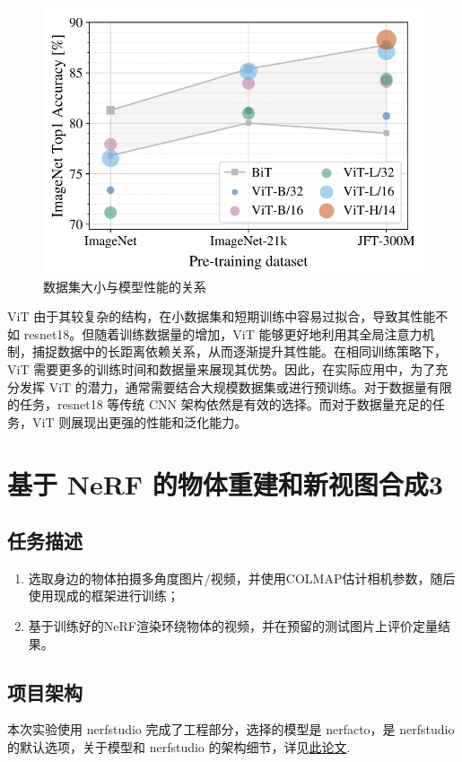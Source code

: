 \documentclass[notitlepage,cs4size,punct,oneside]{ctexrep}
\numberwithin{equation}{chapter}
\theoremstyle{mystyle}
\begin{document}
\begin{figure}[H]
    \centering
    \includegraphics[scale=0.75]{ViT_vs_CNN.png}
    \caption{数据集大小与模型性能的关系}
\end{figure}

ViT 由于其较复杂的结构，在小数据集和短期训练中容易过拟合，导致其性能不如 resnet18。但随着训练数据量的增加，ViT 能够更好地利用其全局注意力机制，捕捉数据中的长距离依赖关系，从而逐渐提升其性能。在相同训练策略下，ViT 需要更多的训练时间和数据量来展现其优势。因此，在实际应用中，为了充分发挥 ViT 的潜力，通常需要结合大规模数据集或进行预训练。对于数据量有限的任务，resnet18 等传统 CNN 架构依然是有效的选择。而对于数据量充足的任务，ViT 则展现出更强的性能和泛化能力。

\chapter{基于 NeRF 的物体重建和新视图合成3}
\section{任务描述}
\begin{enumerate}
\item 选取身边的物体拍摄多角度图片/视频，并使用COLMAP估计相机参数，随后使用现成的框架进行训练；
\item 基于训练好的NeRF渲染环绕物体的视频，并在预留的测试图片上评价定量结果。
\end{enumerate}

\section{项目架构}
本次实验使用 nerfstudio 完成了工程部分，选择的模型是 nerfacto，是 nerfstudio 的默认选项，关于模型和 nerfstudio 的架构细节，详见\href{https://arxiv.org/pdf/2302.04264}{此论文}.
\end{document}
